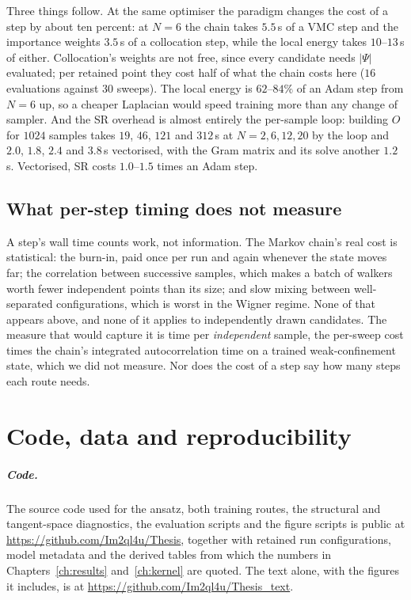 Three things follow. At the same optimiser the paradigm changes the cost of a step by about ten
percent: at $N{=}6$ the chain takes $5.5$\,s of a VMC step and the importance weights $3.5$\,s
of a collocation step, while the local energy takes $10$--$13$\,s of either. Collocation's
weights are not free, since every candidate needs $|\Psi|$ evaluated; per retained point they
cost half of what the chain costs here ($16$ evaluations against $30$ sweeps). The local energy
is $62$--$84\%$ of an Adam step from $N{=}6$ up, so a cheaper Laplacian would speed training more
than any change of sampler. And the SR overhead is almost entirely the per-sample loop: building
$O$ for $1024$ samples takes $19$, $46$, $121$ and $312$\,s at $N=2,6,12,20$ by the loop and
$2.0$, $1.8$, $2.4$ and $3.8$\,s vectorised, with the Gram matrix and its solve another
$1.2$\,s. Vectorised, SR costs $1.0$--$1.5$ times an Adam step.

\section{What per-step timing does not measure}

A step's wall time counts work, not information. The Markov chain's real cost is statistical:
the burn-in, paid once per run and again whenever the state moves far; the correlation between
successive samples, which makes a batch of walkers worth fewer independent points than its
size; and slow mixing between well-separated configurations, which is worst in the Wigner
regime. None of that appears above, and none of it applies to independently drawn candidates.
The measure that would capture it is time per \emph{independent} sample, the per-sweep cost
times the chain's integrated autocorrelation time on a trained weak-confinement state, which we
did not measure. Nor does the cost of a step say how many steps each route needs.

\chapter{Code, data and reproducibility}
\label{app:reproducibility}

\paragraph{Code.} The source code used for the ansatz, both training routes, the structural
and tangent-space diagnostics, the evaluation scripts and the figure scripts is public at
\url{https://github.com/Im2ql4u/Thesis}, together with retained run configurations, model
metadata and the derived tables from which the numbers in Chapters~\ref{ch:results}
and~\ref{ch:kernel} are quoted. The text alone, with the figures it includes, is at
\url{https://github.com/Im2ql4u/Thesis_text}.

